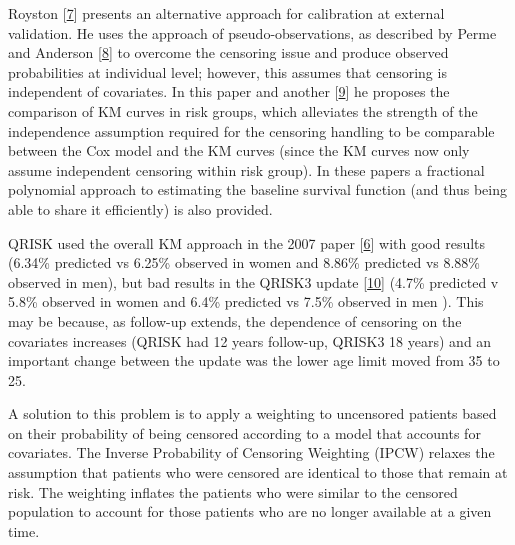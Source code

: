 \documentclass[12pt,PhD,twoside,openright]{muthesis}
\begin{document}
Royston {[}\protect\hyperlink{ref-royston_tools_2014}{7}{]} presents an alternative approach for calibration at external validation. He uses the approach of pseudo-observations, as described by Perme and Anderson {[}\protect\hyperlink{ref-perme_checking_2008}{8}{]} to overcome the censoring issue and produce observed probabilities at individual level; however, this assumes that censoring is independent of covariates. In this paper and another {[}\protect\hyperlink{ref-royston_tools_2015}{9}{]} he proposes the comparison of KM curves in risk groups, which alleviates the strength of the independence assumption required for the censoring handling to be comparable between the Cox model and the KM curves (since the KM curves now only assume independent censoring within risk group). In these papers a fractional polynomial approach to estimating the baseline survival function (and thus being able to share it efficiently) is also provided.

QRISK used the overall KM approach in the 2007 paper {[}\protect\hyperlink{ref-hippisley-cox_derivation_2007}{6}{]} with good results (6.34\% predicted vs 6.25\% observed in women and 8.86\% predicted vs 8.88\% observed in men), but bad results in the QRISK3 update {[}\protect\hyperlink{ref-hippisley-cox_development_2017}{10}{]} (4.7\% predicted v 5.8\% observed in women and 6.4\% predicted vs 7.5\% observed in men ). This may be because, as follow-up extends, the dependence of censoring on the covariates increases (QRISK had 12 years follow-up, QRISK3 18 years) and an important change between the update was the lower age limit moved from 35 to 25.

A solution to this problem is to apply a weighting to uncensored patients based on their probability of being censored according to a model that accounts for covariates. The Inverse Probability of Censoring Weighting (IPCW) relaxes the assumption that patients who were censored are identical to those that remain at risk. The weighting inflates the patients who were similar to the censored population to account for those patients who are no longer available at a given time.
\end{document}
